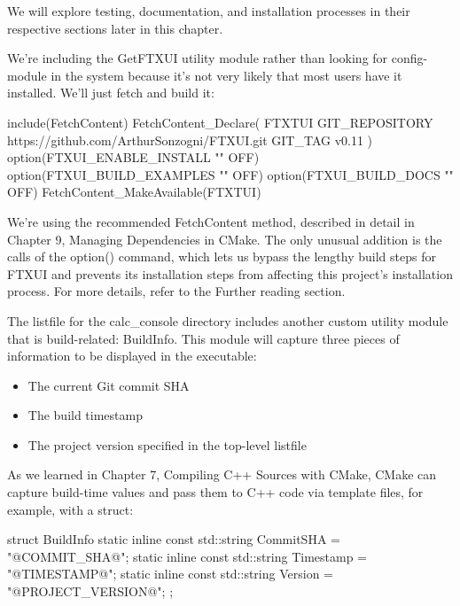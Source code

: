 We will explore testing, documentation, and installation processes in their respective sections later in this chapter.

We’re including the GetFTXUI utility module rather than looking for config-module in the system because it’s not very likely that most users have it installed. We’ll just fetch and build it:


\begin{cmake}
include(FetchContent)
FetchContent_Declare(
    FTXTUI
    GIT_REPOSITORY https://github.com/ArthurSonzogni/FTXUI.git
    GIT_TAG v0.11
)
option(FTXUI_ENABLE_INSTALL "" OFF)
option(FTXUI_BUILD_EXAMPLES "" OFF)
option(FTXUI_BUILD_DOCS "" OFF)
FetchContent_MakeAvailable(FTXTUI)
\end{cmake}

We’re using the recommended FetchContent method, described in detail in Chapter 9, Managing Dependencies in CMake. The only unusual addition is the calls of the option() command, which lets us bypass the lengthy build steps for FTXUI and prevents its installation steps from affecting this project’s installation process. For more details, refer to the Further reading section.

The listfile for the calc\_console directory includes another custom utility module that is build-related: BuildInfo. This module will capture three pieces of information to be displayed in the executable:

\begin{itemize}
\item
The current Git commit SHA

\item
The build timestamp

\item
The project version specified in the top-level listfile
\end{itemize}

As we learned in Chapter 7, Compiling C++ Sources with CMake, CMake can capture build-time values and pass them to C++ code via template files, for example, with a struct:


\begin{cpp}
struct BuildInfo {
    static inline const std::string CommitSHA = "@COMMIT_SHA@";
    static inline const std::string Timestamp = "@TIMESTAMP@";
    static inline const std::string Version = "@PROJECT_VERSION@";
};
\end{cpp}

